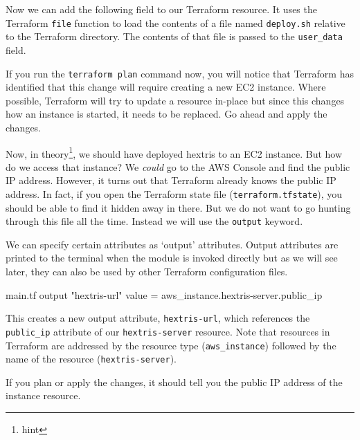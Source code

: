 \documentclass{csse4400}
\begin{document}


Now we can add the following field to our Terraform resource.
It uses the Terraform \texttt{file} function to load the contents of a file named \texttt{deploy.sh} relative to the Terraform directory.
The contents of that file is passed to the \texttt{user\_data} field.


If you run the \texttt{terraform plan} command now,
you will notice that Terraform has identified that this change will require creating a new EC2 instance.
Where possible, Terraform will try to update a resource in-place but since this changes how an instance is started, it needs to be replaced.
Go ahead and apply the changes.

Now, in theory\footnote{hint}, we should have deployed hextris to an EC2 instance.
But how do we access that instance?
We \textsl{could} go to the AWS Console and find the public IP address.
However, it turns out that Terraform already knows the public IP address.
In fact, if you open the Terraform state file (\texttt{terraform.tfstate}),
you should be able to find it hidden away in there.
But we do not want to go hunting through this file all the time.
Instead we will use the \texttt{output} keyword.

We can specify certain attributes as `output' attributes.
Output attributes are printed to the terminal when the module is invoked directly
but as we will see later, they can also be used by other Terraform configuration files.

\begin{code}[language=terraform]{main.tf}
output "hextris-url" {
  value = aws_instance.hextris-server.public_ip
}
\end{code}

This creates a new output attribute, \texttt{hextris-url},
which references the \texttt{public\_ip} attribute of our \texttt{hextris-server} resource.
Note that resources in Terraform are addressed by the resource type (\texttt{aws\_instance})
followed by the name of the resource (\texttt{hextris-server}).

If you plan or apply the changes, it should tell you the public IP address of the instance resource.
\end{document}
